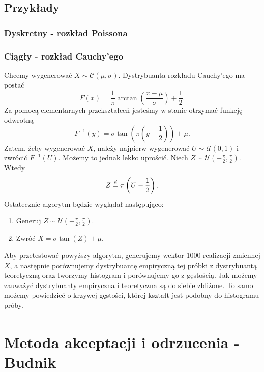\documentclass[12pt]{mwrep}
\begin{document}
	\subsection{Przykłady}
	
	\subsubsection{Dyskretny - rozkład Poissona}
	
	\subsubsection{Ciągły - rozkład Cauchy'ego}
	\noindent Chcemy wygenerować $ X \sim \mathcal{C}(\mu, \sigma) $. 
	Dystrybuanta rozkładu Cauchy'ego ma postać
	$$ F(x) = \frac{1}{\pi} \arctan{\left(\frac{x - \mu}{\sigma}\right)} + \frac{1}{2}. $$
	Za pomocą elementarnych przekształceń jesteśmy w stanie otrzymać funkcję odwrotną
	$$ F^{-1}(y) = \sigma \tan \left(\pi \left(y - \frac{1}{2}\right) \right) + \mu. $$
	Zatem, żeby wygenerować $X$, należy najpierw wygenerować $U \sim \mathcal{U}(0, 1) $ i zwrócić $F^{-1}(U)$. Możemy to jednak lekko uprościć. Niech $ Z \sim \mathcal{U}\left(-\frac{\pi}{2}, \frac{\pi}{2}\right) $. Wtedy
	$$ Z \buildrel{d}\over{=} \pi \left(U - \frac{1}{2}\right). $$
	Ostatecznie algorytm będzie wyglądał następująco:
	\begin{enumerate}[leftmargin=10mm]
		\item Generuj $Z \sim \mathcal{U}\left(-\frac{\pi}{2}, \frac{\pi}{2}\right)$.
		\item Zwróć $ X = \sigma \tan(Z) + \mu $.
	\end{enumerate}
	Aby przetestować powyższy algorytm, generujemy wektor 1000 realizacji zmiennej $X$, a następnie porównujemy dystrybuantę empiryczną tej próbki z dystrybuantą teoretyczną oraz tworzymy histogram i porównujemy go z gęstością.
	Jak możemy zauważyć dystrybuanty empiryczna i teoretyczna są do siebie zbliżone. To samo możemy powiedzieć o krzywej gęstości, której kształt jest podobny do histogramu próby.



	
	\section{Metoda akceptacji i odrzucenia\textsuperscript{\cite{AO - dyskretny}} - Budnik}
\end{document}
